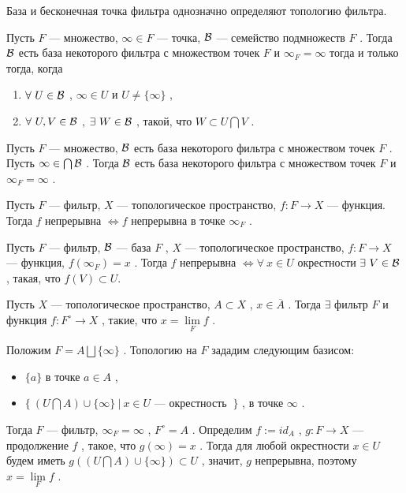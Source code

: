 \SSsect База и бесконечная точка фильтра однозначно определяют топологию фильтра. 

\SSsect Пусть \( F \) --- множество, \( \infty \in F \) --- точка, \( \mathcal{B} \) --- семейство подмножеств \( F \) . Тогда \( \mathcal{B} \) есть база некоторого фильтра с множеством точек \( F \) и \( \infty_F = \infty \) тогда и только тогда, когда 
\begin{enumerate}[label={\alph*)}]
\item \( \forall~U \in \mathcal{B} \) , \( \infty \in U \) и \( U \neq \{\infty\} \) ,  
\item \( \forall~U,V \in \mathcal{B} \) , \( \exists~W \in \mathcal{B} \) , такой, что \( W \subset U\bigcap V \) .
\end{enumerate}

\SSsect Пусть \( F \) --- множество, \( \mathcal{B} \) есть база некоторого фильтра с множеством точек \( F \) . Пусть \( \infty \in \bigcap \mathcal{B} \) . Тогда \( \mathcal{B} \) есть база некоторого фильтра с множеством точек \( F \) и \( \infty_F = \infty \) .

\SSsect Пусть \( F \) --- фильтр, \( X \) --- топологическое пространство, \( f: F \rightarrow X \) --- функция. Тогда \( f \) непрерывна \( \Leftrightarrow f \) непрерывна в точке \( \infty_F \) .

\SSsect Пусть \( F \) --- фильтр, \( \mathcal{B} \) --- база \( F \) , \( X \) --- топологическое пространство, \( f: F \rightarrow X \) --- функция, \( f(\infty_F)=x \) . Тогда \( f \) непрерывна \( \Leftrightarrow \forall~x \in U \) окрестности \( \exists~V \in \mathcal{B} \) , такая, что \( f(V) \subset U \).

\SSsect[!] Пусть \( X \) --- топологическое пространство, \( A \subset X \) , \( x \in \overline{A} \) . Тогда \( \exists \) фильтр \( F \) и функция \( f: F^\circ \rightarrow X \) , такие, что \( x = \lim\limits_{F} f \) .

\SSproof

Положим \( F = A \bigsqcup \{\infty\} \) . Топологию на \( F \) зададим следующим базисом:
\begin{itemize}[label=]
\item \( \{a\} \) в точке \( a \in A \) ,
\item \( \{~( U \bigcap A ) \cup \{\infty\} ~|~ x \in U \) --- окрестность \( ~\} \) , в точке \( \infty \) .
\end{itemize}

Тогда \( F \) --- фильтр, \( \infty_F=\infty \) , \( F^\circ=A \) . Определим \( f:=id_A \) , \( g: F \rightarrow X \) --- продолжение \( f \) , такое, что \( g(\infty)=x \) . Тогда для любой окрестности \( x \in U \) будем иметь \( g(( U \bigcap A ) \cup \{\infty\}) \subset U \) , значит, \( g \) непрерывна, поэтому \( x = \lim\limits_{F} f \) .

